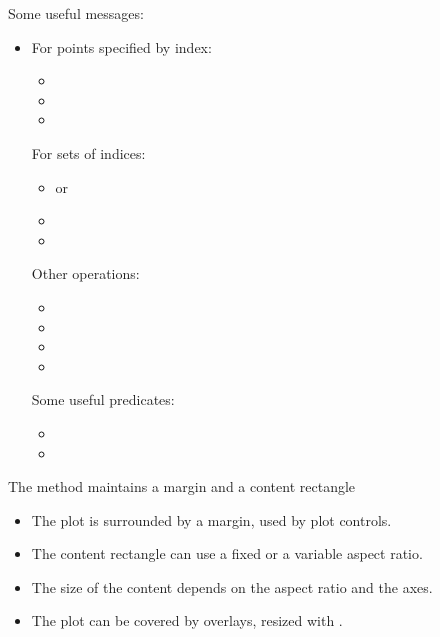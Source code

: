\begin{slide}{}
Some useful messages:
\begin{itemize}
\item[] For points specified by index:
\begin{itemize}
\item[] 
\item[] 
\item[] 
\end{itemize}
For sets of indices:
\begin{itemize}
\item[]  or 
\item[] 
\item[] 
\end{itemize}
Other operations:
\begin{itemize}
\item[] 
\item[] 
\item[] 
\item[] 
\end{itemize}
Some useful predicates:
\begin{itemize}
\item[] 
\item[]  
\end{itemize}
\end{itemize}
\end{slide}

\begin{slide}{}
The  method maintains a margin and a content rectangle
\begin{center}
\mbox{}
\end{center}

\begin{itemize}
\item
The plot is surrounded by a margin, used by plot controls.
\item
The content rectangle can use a fixed or a variable aspect ratio.
\item
The size of the content depends on the aspect ratio and the axes.
\item
The plot can be covered by overlays, resized with .
\end{itemize}
\end{slide}

